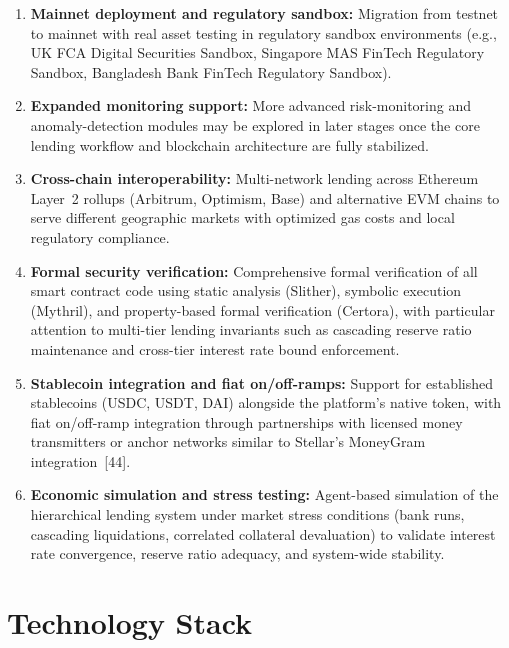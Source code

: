 \documentclass[12pt,a4paper]{report}
\begin{document}
\begin{enumerate}[noitemsep]
\item \textbf{Mainnet deployment and regulatory sandbox:} Migration from testnet to mainnet with real asset testing in regulatory sandbox environments (e.g., UK FCA Digital Securities Sandbox, Singapore MAS FinTech Regulatory Sandbox, Bangladesh Bank FinTech Regulatory Sandbox).
\item \textbf{Expanded monitoring support:} More advanced risk-monitoring and anomaly-detection modules may be explored in later stages once the core lending workflow and blockchain architecture are fully stabilized.
\item \textbf{Cross-chain interoperability:} Multi-network lending across Ethereum Layer~2 rollups (Arbitrum, Optimism, Base) and alternative EVM chains to serve different geographic markets with optimized gas costs and local regulatory compliance.
\item \textbf{Formal security verification:} Comprehensive formal verification of all smart contract code using static analysis (Slither), symbolic execution (Mythril), and property-based formal verification (Certora), with particular attention to multi-tier lending invariants such as cascading reserve ratio maintenance and cross-tier interest rate bound enforcement.
\item \textbf{Stablecoin integration and fiat on/off-ramps:} Support for established stablecoins (USDC, USDT, DAI) alongside the platform's native token, with fiat on/off-ramp integration through partnerships with licensed money transmitters or anchor networks similar to Stellar's MoneyGram integration~[44].
\item \textbf{Economic simulation and stress testing:} Agent-based simulation of the hierarchical lending system under market stress conditions (bank runs, cascading liquidations, correlated collateral devaluation) to validate interest rate convergence, reserve ratio adequacy, and system-wide stability.
\end{enumerate}


\appendix

\chapter{Technology Stack}
\end{document}
